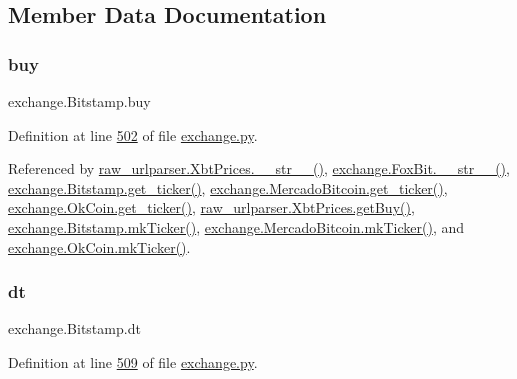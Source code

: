 \subsection{Member Data Documentation}
\mbox{\label{classexchange_1_1_bitstamp_a40aa1ff3335ef4c80a5107234e05e23e}} 
\subsubsection{\texorpdfstring{buy}{buy}}
{\footnotesize\ttfamily exchange.\+Bitstamp.\+buy}



Definition at line \hyperlink{exchange_8py_source_l00502}{502} of file \hyperlink{exchange_8py_source}{exchange.\+py}.



Referenced by \hyperlink{raw__urlparser_8py_source_l00074}{raw\+\_\+urlparser.\+Xbt\+Prices.\+\_\+\+\_\+str\+\_\+\+\_\+()}, \hyperlink{exchange_8py_source_l00610}{exchange.\+Fox\+Bit.\+\_\+\+\_\+str\+\_\+\+\_\+()}, \hyperlink{exchange_8py_source_l00511}{exchange.\+Bitstamp.\+get\+\_\+ticker()}, \hyperlink{exchange_8py_source_l00651}{exchange.\+Mercado\+Bitcoin.\+get\+\_\+ticker()}, \hyperlink{exchange_8py_source_l00716}{exchange.\+Ok\+Coin.\+get\+\_\+ticker()}, \hyperlink{raw__urlparser_8py_source_l00062}{raw\+\_\+urlparser.\+Xbt\+Prices.\+get\+Buy()}, \hyperlink{exchange_8py_source_l00525}{exchange.\+Bitstamp.\+mk\+Ticker()}, \hyperlink{exchange_8py_source_l00665}{exchange.\+Mercado\+Bitcoin.\+mk\+Ticker()}, and \hyperlink{exchange_8py_source_l00730}{exchange.\+Ok\+Coin.\+mk\+Ticker()}.

\mbox{\label{classexchange_1_1_bitstamp_a527b7d7c5814118b5adfdaf0b960f036}} 
\subsubsection{\texorpdfstring{dt}{dt}}
{\footnotesize\ttfamily exchange.\+Bitstamp.\+dt}



Definition at line \hyperlink{exchange_8py_source_l00509}{509} of file \hyperlink{exchange_8py_source}{exchange.\+py}.



